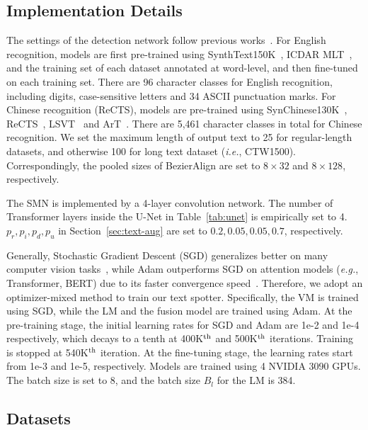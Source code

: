 \documentclass[10pt,journal,compsoc]{IEEEtran}
\def\ie{{\it i.e.}\xspace}
\def\eg{{\it e.g.}\xspace}
\begin{document}
\subsection{Implementation Details}

The settings of the detection network follow previous works~\cite{liu2020abcnetv2,liu2020abcnet}. For English recognition, models are first pre-trained using SynthText150K~\cite{liu2020abcnet}, ICDAR MLT~\cite{nayef2017icdar2017}, and the training set of each dataset annotated at word-level, and then fine-tuned on each training set. There are 96 character classes for English recognition, including digits, case-sensitive letters and 34 ASCII punctuation marks. For Chinese recognition (ReCTS), models are pre-trained using SynChinese130K~\cite{liu2020abcnet}, ReCTS~\cite{zhang2019icdar}, LSVT~\cite{sun2019icdar} and ArT~\cite{chng2019icdar2019}. There are 5,461 character classes in total for Chinese recognition. We set the maximum length of output text to 25 for regular-length datasets, and otherwise 100 for long text dataset (\ie, CTW1500). Correspondingly, the pooled sizes of BezierAlign are set to $8 \times 32$ and $8 \times 128$, respectively.

The SMN is implemented by a 4-layer convolution network. The number of Transformer layers inside the U-Net in Table~\ref{tab:unet} is empirically set to 4. $p_r, p_i, p_d, p_u$ in Section~\ref{sec:text-aug} are set to $0.2, 0.05, 0.05, 0.7$, respectively.

Generally, Stochastic Gradient Descent (SGD) generalizes better on many computer vision tasks~\cite{zhou2020towards, he2017mask}, while Adam outperforms SGD on attention models (\eg, Transformer\cite{vaswani2017attention}, BERT\cite{devlin2018bert}) due to its faster convergence speed~\cite{zhang2019adam}. Therefore, we adopt an optimizer-mixed method to train our text spotter. Specifically, the VM is trained using SGD, while the LM and the fusion model are trained using Adam. At the pre-training stage, the initial learning rates for SGD and Adam are 1e-2 and 1e-4 respectively, which decays to a tenth at 400K$^{\rm th}$ and 500K$^{\rm th}$ iterations. Training is stopped at 540K$^{\rm th}$ iteration. At the fine-tuning stage, the learning rates start from 1e-3 and 1e-5, respectively. Models are trained using 4 NVIDIA 3090 GPUs. The batch size is set to 8, and the batch size $B_l$ for the LM is 384.


\subsection{Datasets}
\end{document}
